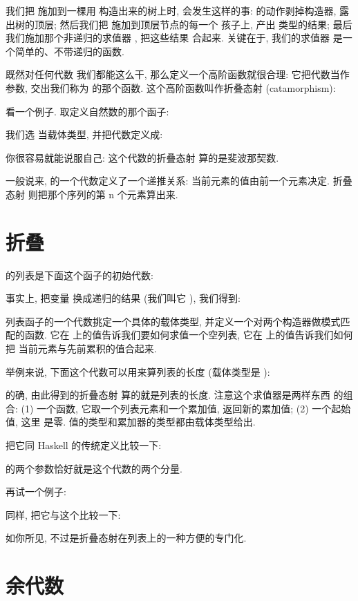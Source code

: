 我们把  施加到一棵用  构造出来的树上时, 会发生这样的事:
 的动作剥掉构造器, 露出树的顶层; 然后我们把  施加到顶层节点的每一个
孩子上, 产出  类型的结果; 最后我们施加那个非递归的求值器 , 把这些结果
合起来. 关键在于, 我们的求值器  是一个简单的、不带递归的函数.

既然对任何代数  我们都能这么干, 那么定义一个高阶函数就很合理: 它把代数当作参数,
交出我们称为  的那个函数. 这个高阶函数叫作折叠态射 (catamorphism):

看一个例子. 取定义自然数的那个函子:

我们选  当载体类型, 并把代数定义成:

你很容易就能说服自己: 这个代数的折叠态射  算的是斐波那契数.

一般说来,  的一个代数定义了一个递推关系: 当前元素的值由前一个元素决定. 折叠态射
则把那个序列的第 n 个元素算出来.

\section{折叠}

 的列表是下面这个函子的初始代数:

事实上, 把变量  换成递归的结果 (我们叫它 ), 我们得到:

列表函子的一个代数挑定一个具体的载体类型, 并定义一个对两个构造器做模式匹配的函数. 它在
 上的值告诉我们要如何求值一个空列表, 它在  上的值告诉我们如何把
当前元素与先前累积的值合起来.

举例来说, 下面这个代数可以用来算列表的长度 (载体类型是 ):

的确, 由此得到的折叠态射  算的就是列表的长度. 注意这个求值器是两样东西
的组合: (1) 一个函数, 它取一个列表元素和一个累加值, 返回新的累加值; (2) 一个起始值, 这里
是零. 值的类型和累加器的类型都由载体类型给出.

把它同 Haskell 的传统定义比较一下:

 的两个参数恰好就是这个代数的两个分量.

再试一个例子:

同样, 把它与这个比较一下:

如你所见,  不过是折叠态射在列表上的一种方便的专门化.

\section{余代数}

